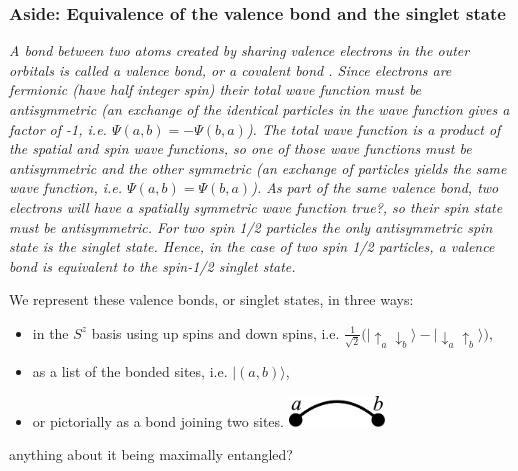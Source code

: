 \subsubsection{Aside: Equivalence of the valence bond and the singlet state}
{\it{A bond between two atoms created by sharing valence electrons in the outer orbitals is called a valence bond, or a covalent bond \cite{Slater1931,Pauling1933}.
Since electrons are fermionic (have half integer spin) their total
wave function must be antisymmetric (an exchange of the identical particles in the wave function
gives a factor of -1, i.e. $\Psi(a,b) = -\Psi(b,a)$).
The total wave function is a product of the spatial and spin wave functions, so one of those wave functions must be antisymmetric and the other symmetric (an exchange of particles yields the same wave function, i.e. $\Psi(a,b) = \Psi(b,a)$).
As part of the same valence bond, two electrons will have a spatially symmetric wave function {\color{red} true?}, so their spin state must be antisymmetric.  For two spin 1/2 particles the only antisymmetric spin state is the singlet state.  
Hence, in the case of two spin 1/2 particles, a valence bond is equivalent to the spin-1/2 singlet state.}}

We represent these valence bonds, or singlet states, in three ways: 
\begin{itemize}
\item{in the $S^z$ basis using up spins and down spins, 
i.e. $\tfrac{1}{\sqrt{2}}\big(\lvert \uparrow_a \downarrow_b \rangle - \lvert \downarrow_a \uparrow_b \rangle\big)$,}
\item{ as a list of the bonded sites, i.e. $\lvert(a,b)\rangle$,}
\item{
or pictorially as a bond joining two sites.\; \includegraphics[width=1in]{./figures/made/bond2.pdf}}
\end{itemize}

{\color{red} anything about it being maximally entangled?}

